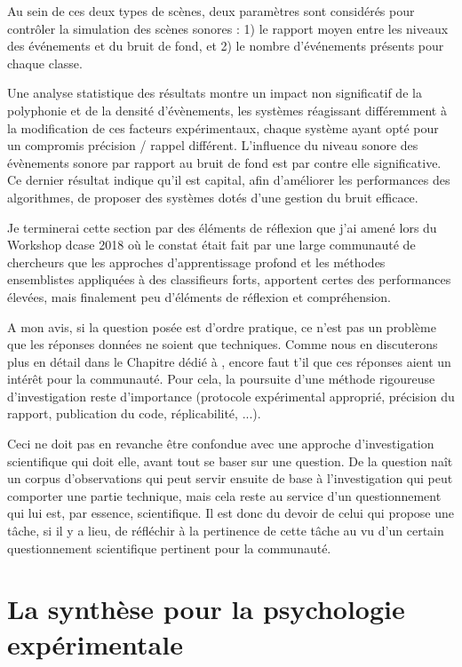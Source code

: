   Au sein de ces deux types de scènes, deux paramètres sont considérés pour contrôler la simulation des scènes sonores : 1) le rapport moyen entre les niveaux des événements et du bruit de fond, et 2) le nombre d'événements présents pour chaque classe.

  Une analyse statistique des résultats\cite{lafayhal-01635414} montre un impact non significatif de la polyphonie et de la densité d'évènements, les systèmes réagissant différemment à la modification de ces facteurs expérimentaux, chaque système ayant opté pour un compromis précision / rappel différent. L'influence du niveau sonore des évènements sonore par rapport au bruit de fond est par contre elle significative. Ce dernier résultat indique qu'il est capital, afin d'améliorer les performances des algorithmes, de proposer des systèmes dotés d'une gestion du bruit efficace.

  Je terminerai cette section par des éléments de réflexion que j'ai amené lors du Workshop dcase 2018 où le constat était fait par une large communauté de chercheurs que les approches d'apprentissage profond et les méthodes ensemblistes appliquées à des classifieurs forts, apportent certes des performances élevées, mais finalement peu d'éléments de réflexion et compréhension.

  A mon avis, si la question posée est d'ordre pratique, ce n'est pas un problème que les réponses données ne soient que techniques. Comme nous en discuterons plus en détail dans le Chapitre dédié à , encore faut t'il que ces réponses aient un intérêt pour la communauté. Pour cela, la poursuite d'une méthode rigoureuse d'investigation reste d'importance (protocole expérimental approprié, précision du rapport, publication du code, réplicabilité, ...).

  Ceci ne doit pas en revanche être confondue avec une approche d'investigation scientifique qui doit elle, avant tout se baser sur une question. De la question naît un corpus d'observations qui peut servir ensuite de base à l'investigation qui peut comporter une partie technique, mais cela reste au service d'un questionnement qui lui est, par essence, scientifique. Il est donc du devoir de celui qui propose une tâche, si il y a lieu, de réfléchir à la pertinence de cette tâche au vu d'un certain questionnement scientifique pertinent pour la communauté.

  \section{ \nmu La  synthèse pour la psychologie expérimentale} \label{sec:psycho}

